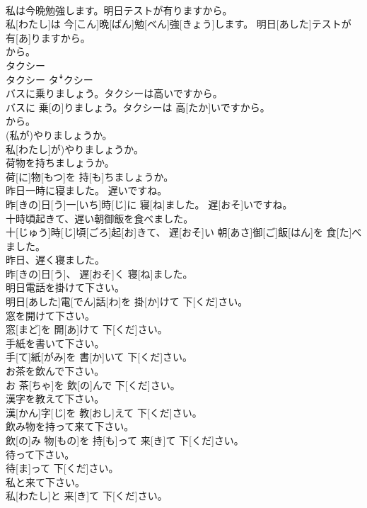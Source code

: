 \documentclass[8pt]{extreport}
\begin{document}
\begin{CJK}{UTF8}{min}
\\	私は今晩勉強します。明日テストが有りますから。	
\\	私[わたし]は 今[こん]晩[ばん]勉[べん]強[きょう]します。 明日[あした]テストが 有[あ]りますから。 
\\	から。
\\	タクシー	
\\	タクシー	タꜜクシー
\\	バスに乗りましょう。タクシーは高いですから。	
\\	バスに 乗[の]りましょう。タクシーは 高[たか]いですから。 
\\	から。
\\	(私が)やりましょうか。	
\\	私[わたし]が)やりましょうか。
\\	荷物を持ちましょうか。	
\\	荷[に]物[もつ]を 持[も]ちましょうか。
\\	昨日一時に寝ました。 遅いですね。	
\\	昨[きの]日[う]一[いち]時[じ]に 寝[ね]ました。 遅[おそ]いですね。
\\	十時頃起きて、遅い朝御飯を食べました。	
\\	十[じゅう]時[じ]頃[ごろ]起[お]きて、 遅[おそ]い 朝[あさ]御[ご]飯[はん]を 食[た]べました。
\\	昨日、遅く寝ました。	
\\	昨[きの]日[う]、 遅[おそ]く 寝[ね]ました。
\\	明日電話を掛けて下さい。	
\\	明日[あした]電[でん]話[わ]を 掛[か]けて 下[くだ]さい。
\\	窓を開けて下さい。	
\\	窓[まど]を 開[あ]けて 下[くだ]さい。
\\	手紙を書いて下さい。	
\\	手[て]紙[がみ]を 書[か]いて 下[くだ]さい。
\\	お茶を飲んで下さい。	
\\	お 茶[ちゃ]を 飲[の]んで 下[くだ]さい。
\\	漢字を教えて下さい。	
\\	漢[かん]字[じ]を 教[おし]えて 下[くだ]さい。
\\	飲み物を持って来て下さい。	
\\	飲[の]み 物[もの]を 持[も]って 来[き]て 下[くだ]さい。
\\	待って下さい。	
\\	待[ま]って 下[くだ]さい。
\\	私と来て下さい。	
\\	私[わたし]と 来[き]て 下[くだ]さい。

\end{CJK}
\end{document}
